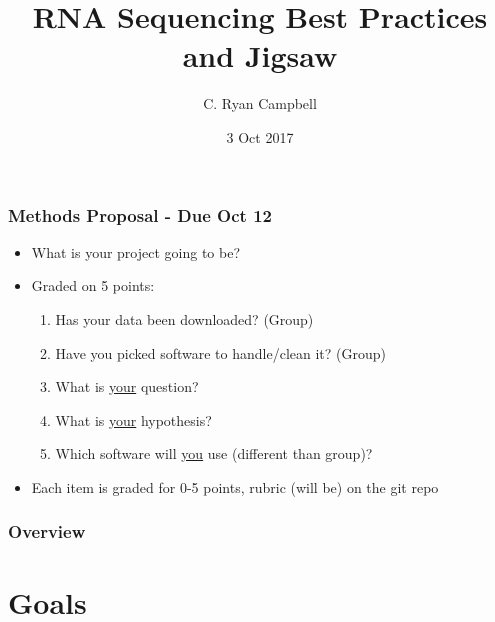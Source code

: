 \documentclass[14pt]{beamer}
\title[RNAseq]{RNA Sequencing Best Practices and Jigsaw} %
\author{C. Ryan Campbell} %
\institute[Duke] %
{
Duke University \\ %
\medskip
\textit{c.ryan.campbell@duke.edu} %
}
\date{3 Oct 2017} %
\begin{document}
\begin{frame}
\titlepage %
\end{frame}

\begin{frame}
\frametitle{Methods Proposal - Due Oct 12}
\begin{itemize}
	\item<+-> What is your project going to be?
	\item<+-> Graded on 5 points:
	\begin{enumerate}
		\item<+-> Has your data been downloaded? (Group)
		\item<+-> Have you picked software to handle/clean it? (Group)
		\item<+-> What is \underline{your} question?
		\item<+-> What is \underline{your} hypothesis?
		\item<+-> Which software will \underline{you} use (different than group)?
	\end{enumerate}
	\item<+-> Each item is graded for 0-5 points, rubric (will be) on the git repo
\end{itemize}
\end{frame}


\begin{frame}
\frametitle{Overview} %
\tableofcontents %
\end{frame}


\section{Goals} 
\end{document}
